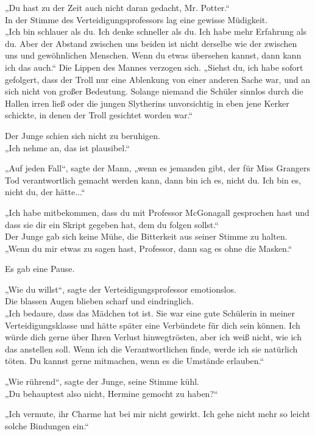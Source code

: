 {„Du hast zu der Zeit auch nicht daran gedacht, Mr. Potter.“\\ In der Stimme des Verteidigungsprofessors lag eine gewisse Müdigkeit.\\ „Ich bin schlauer als du. Ich denke schneller als du. Ich habe mehr Erfahrung als du. Aber der Abstand zwischen uns beiden ist nicht derselbe wie der zwischen uns und gewöhnlichen Menschen. Wenn du etwas übersehen kannst, dann kann ich das auch.“ Die Lippen des Mannes verzogen sich. „Siehst du, ich habe sofort gefolgert, dass der Troll nur eine Ablenkung von einer anderen Sache war, und an sich nicht von großer Bedeutung. Solange niemand die Schüler sinnlos durch die Hallen irren ließ oder die jungen Slytherins unvorsichtig in eben jene Kerker schickte, in denen der Troll gesichtet worden war.“

Der Junge schien sich nicht zu beruhigen.\\ „Ich nehme an, das ist plausibel.“

„Auf jeden Fall“, sagte der Mann, „wenn es jemanden gibt, der für Miss Grangers Tod verantwortlich gemacht werden kann, dann bin ich es, nicht du. Ich bin es, nicht du, der hätte...“

„Ich habe mitbekommen, dass du mit Professor McGonagall gesprochen hast und dass sie dir ein Skript gegeben hat, dem du folgen sollst.“\\ Der Junge gab sich keine Mühe, die Bitterkeit aus seiner Stimme zu halten.\\ „Wenn du mir etwas zu sagen hast, Professor, dann sag es ohne die Masken.“

Es gab eine Pause.

„Wie du willst“, sagte der Verteidigungsprofessor emotionslos.\\ Die blassen Augen blieben scharf und eindringlich.\\ „Ich bedaure, dass das Mädchen tot ist. Sie war eine gute Schülerin in meiner Verteidigungsklasse und hätte später eine Verbündete für dich sein können. Ich würde dich gerne über Ihren Verlust hinwegtrösten, aber ich weiß nicht, wie ich das anstellen soll. Wenn ich die Verantwortlichen finde, werde ich sie natürlich töten. Du kannst gerne mitmachen, wenn es die Umstände erlauben.“

„Wie rührend“, sagte der Junge, seine Stimme kühl.\\ „Du behauptest also nicht, Hermine gemocht zu haben?“

„Ich vermute, ihr Charme hat bei mir nicht gewirkt. Ich gehe nicht mehr so leicht solche Bindungen ein.“

}

